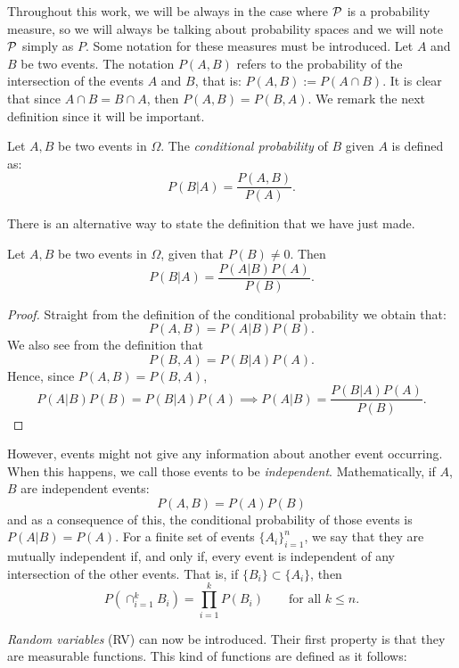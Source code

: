 Throughout this work, we will be always in the case where $\mathcal{P}$ is a probability measure, so we will always be talking about probability spaces and we will note $\mathcal{P}$ simply as $P$. Some notation for these measures must be introduced. Let $A$ and $B$ be two events.
The notation $P(A,B)$ refers to the probability of the intersection of the events $A$ and $B$, that is: $P(A,B) := P(A\cap B)$.
 It is clear that since $A \cap B = B \cap A$, then $P(A,B) = P(B,A)$. We remark the next definition since it will be important.

\begin{ndef}
Let $A,B$ be two events in $\Omega$. The \emph{conditional probability} of $B$ given $A$ is defined as:
$$
P(B|A) = \frac{P(A,B)}{P(A)}.
$$
\end{ndef}




There is an alternative way to state the definition that we have just made.

\begin{nth}
Let $A,B$ be two events in $\Omega$, given that $P(B) \neq 0$. Then
$$
P(B|A) = \frac{P(A|B) P(A)}{P(B)}.
$$
\end{nth}
\begin{proof}
Straight from the definition of the conditional probability we obtain that:
$$
P(A,B) = P(A|B)P(B).
$$
We also see from the definition that
$$
P(B,A) = P(B|A)P(A).
$$
Hence, since $P(A,B) = P(B,A)$,
$$
P(A|B)P(B) = P(B|A)P(A) \implies P(A|B) = \frac{P(B|A)P(A)}{P(B)}.
$$
\end{proof}


However, events might not give any information about another event occurring. When this happens, we call those events to be \emph{independent}. Mathematically, if $A$,$B$ are independent events:
$$
P(A,B) = P(A)P(B)
$$
and as a consequence of this, the conditional probability of those events is $P(A|B) = P(A)$. For a finite set of events $\{A_i\}_{i=1}^n$, we say that they are mutually independent if, and only if, every event is independent of any intersection of the other events. 
That is, if $\{B_i\} \subset \{A_i\}$, then
$$
P\left(\cap_{i = 1}^k B_i \right) = \prod_{i = 1}^k P(B_i) \quad \quad \text{for all } k \leq n.
$$

\emph{Random variables} (RV) can now be introduced. Their first property is that they are measurable functions. This kind of functions are defined as it follows:

